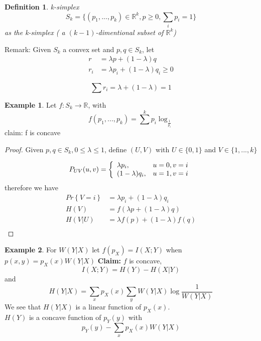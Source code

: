 \documentclass{article}
\newtheorem{definition}{Definition}[section]
\theoremstyle{definition} %
\newtheorem{example}{Example}
\renewcommand{\Pr}[1]{Pr\left\{#1\right\}}
\def\R{\mathbb{R}}
\begin{document}
\begin{appendices}
\begin{definition}{k-simplex}
\[ S_k = \{(p_1, ..., p_k) \in \R^k , p \geq 0, \sum_i p_i = 1 \} \]
as the k-simplex ( a $(k-1)$-dimentional subset of $\R^k$)
\end{definition}

Remark:
Given $S_k$ a convex set and $p,q \in S_k$, let
\begin{align*}
  r   &= \lambda p + (1 - \lambda)q \\
  r_i &= \lambda p_i + (1 - \lambda) q_i \geq 0
\end{align*}

\[ \sum r_i = \lambda + (1 - \lambda) = 1 \]

\begin{example}
  Let $f : S_k \rightarrow \R $, with
  \[ f(p_1, ..., p_k) = \sum^k p_i \log_{\frac{1}{p_i}} \]
  claim: f is concave

  \begin{proof}
    Given $p, q \in S_k, 0 \leq \lambda \leq 1$, define $(U, V)$ with $U \in \{0, 1\}$ and $V \in \{1, ..., k\}$

    \begin{align*}
      P_{UV}(u, v) =
      \left\{
      \begin{array}{l l}
        \lambda p_i, & u=0, v=i \\
        (1 - \lambda)q_i, & u=1, v=i
      \end{array}
      \right.
    \end{align*}
    therefore we have
    \begin{align*}
      \Pr{V = i} &= \lambda p_i + (1 - \lambda) q_i \\
      H(V) &= f(\lambda p + (1 - \lambda) q) \\
      H(V | U) &= \lambda f(p) + (1 - \lambda) f(q) \\
    \end{align*}
  \end{proof}
\end{example}


\begin{example}
  For $W(Y | X)$ let $f(p_X) = I(X ; Y)$ when $p(x, y) = p_X(x) W(Y | X) $
  \textbf{Claim:} $f$ is concave,
  \[ I(X ; Y) = H(Y) - H(X | Y) \]
  and
  \[ H(Y|X) = \sum_x p_X(x) \sum_y W(Y|X) \log \frac{1}{W(Y | X)} \]
  We see that $H(Y|X)$ is a linear function of $p_X(x)$.\\
  $H(Y)$ is a concave function of $p_Y(y)$ with
  \[ p_Y(y) - \sum_x p_X(x) W(Y|X) \]


\end{example}
\end{appendices}
\end{document}
